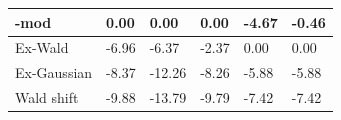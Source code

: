 \begin{tabular}{|l|l|l|l|l|l|}
\hline
\rocdd{}-mod&0.00&0.00&0.00&-4.67&-0.46\\\hline
Ex-Wald&-6.96&-6.37&-2.37&0.00&0.00\\\hline
Ex-Gaussian&-8.37&-12.26&-8.26&-5.88&-5.88\\\hline
Wald shift&-9.88&-13.79&-9.79&-7.42&-7.42\\\hline
\end{tabular}
